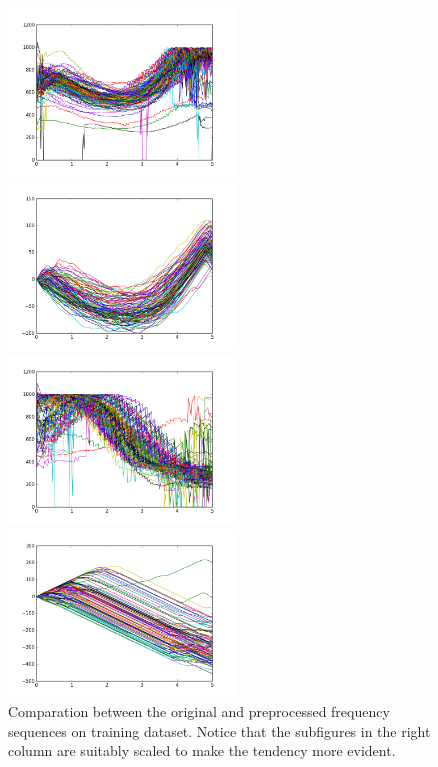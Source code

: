 \documentclass[a4paper, 11pt]{article} %
\begin{document}
\begin{figure}[H]
\begin{minipage}{0.5\linewidth}
\end{minipage}
\vfill\begin{minipage}{0.5\linewidth}
\centerline{\includegraphics[width=6.0cm]{figure/originf0_3.png}}
\end{minipage}
\hfill
\begin{minipage}{0.5\linewidth}
\centerline{\includegraphics[width=6.0cm]{figure/finalnorm_3.png}}
\end{minipage}
\vfill\begin{minipage}{0.5\linewidth}
\centerline{\includegraphics[width=6.0cm]{figure/originf0_4.png}}
\end{minipage}
\hfill
\begin{minipage}{0.5\linewidth}
\centerline{\includegraphics[width=6.0cm]{figure/finalnorm_4.png}}
\end{minipage}
\vfill
\caption{Comparation between the original and preprocessed frequency sequences on training dataset. Notice that the subfigures in the right column are suitably scaled to make the tendency more evident.}
\label{fig_f0compare}
\end{figure}
\end{document}
